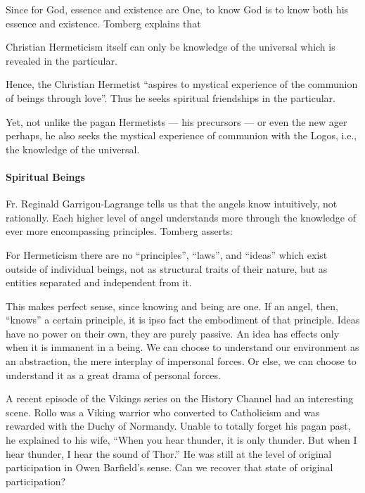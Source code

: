 Since for God, essence and existence are One, to know God is to know both his essence and existence. Tomberg explains
that

\begin{quotex}
Christian Hermeticism itself can only be knowledge of the universal which is revealed in the particular. 

\end{quotex}

Hence, the Christian Hermetist “aspires to mystical experience of the communion of beings through love”. Thus he seeks
spiritual friendships in the particular.

Yet, not unlike the pagan Hermetists — his precursors — or even the new ager perhaps, he also
seeks the mystical experience of communion with the Logos, i.e., the knowledge of the universal.

\paragraph{Spiritual Beings}
Fr. Reginald Garrigou-Lagrange tells us that the angels know intuitively, not rationally. Each higher level of angel
understands more through the knowledge of ever more encompassing principles. Tomberg asserts:

\begin{quotex}
For Hermeticism there are no “principles”, “laws”, and “ideas” which exist outside of individual beings, not as
structural traits of their nature, but as entities separated and independent from it. 

\end{quotex}

This makes perfect sense, since knowing and being are one. If an angel, then, “knows” a certain principle, it is ipso
fact the embodiment of that principle. Ideas have no power on their own, they are purely passive. An idea has effects
only when it is immanent in a being. We can choose to understand our environment as an abstraction, the mere interplay
of impersonal forces. Or else, we can choose to understand it as a great drama of personal forces.

A recent episode of the Vikings series on the History Channel had an interesting scene. Rollo was a Viking warrior who
converted to Catholicism and was rewarded with the Duchy of Normandy. Unable to totally forget his pagan past, he
explained to his wife, “When you hear thunder, it is only thunder. But when I hear thunder, I hear the sound of Thor.”
He was still at the level of original participation in Owen Barfield's sense. Can we recover that state of
original participation?

